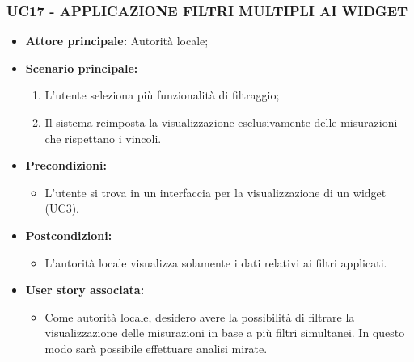 \subsubsection{UC17 - APPLICAZIONE FILTRI MULTIPLI AI WIDGET}
\begin{itemize}
    \item \textbf{Attore principale:} Autorità locale;
    \item \textbf{Scenario principale:}
          \begin{enumerate}
              \item L'utente seleziona più funzionalità di filtraggio;
              \item Il sistema reimposta la visualizzazione esclusivamente delle misurazioni che rispettano i vincoli.
          \end{enumerate}
    \item \textbf{Precondizioni:}
          \begin{itemize}
              \item  L'utente si trova in un interfaccia per la visualizzazione di un widget (UC3).
          \end{itemize}
    \item \textbf{Postcondizioni:}
          \begin{itemize}
              \item  L'autorità locale visualizza solamente i dati relativi ai filtri applicati.
          \end{itemize}
    \item \textbf{User story associata:}
          \begin{itemize}
            \item Come autorità locale, desidero avere la possibilità di filtrare la visualizzazione delle misurazioni in base a più filtri simultanei. In questo modo sarà possibile effettuare analisi mirate.
          \end{itemize}
\end{itemize}
